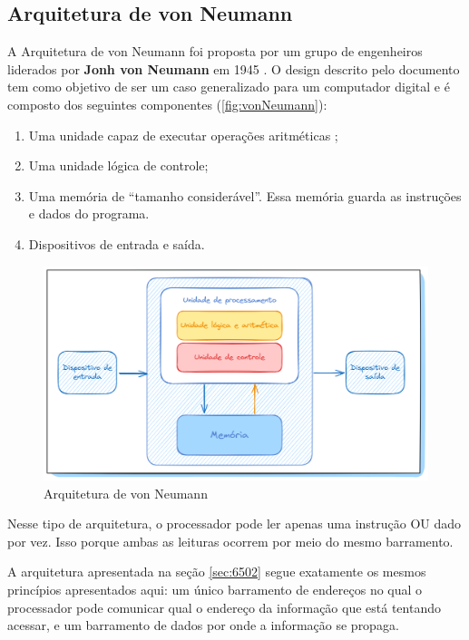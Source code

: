 \documentclass[
	12pt,				  %
	openright,		%
	a4paper,			%
	english,			%
	french,				%
	spanish,			%
	brazil,				%
]{abntex2}
\begin{document}
\subsection{Arquitetura de von Neumann}

A Arquitetura de von Neumann foi proposta por um grupo de engenheiros liderados
por \textbf{Jonh von Neumann} em 1945 \cite{vonNeumann}. O design descrito pelo
documento tem como objetivo de ser um caso generalizado para um computador
digital e é composto dos seguintes componentes (\autoref{fig:vonNeumann}):
\begin{enumerate}
	\item Uma unidade capaz de executar operações aritméticas ;
	\item Uma unidade lógica de controle;
	\item Uma memória de ``tamanho considerável''. Essa memória guarda as
	      instruções e dados do programa.
	\item Dispositivos de entrada e saída.
\end{enumerate}

\begin{figure}[h]
	\centering
	\caption{Arquitetura de von Neumann}
	\label{fig:vonNeumann}
	\includegraphics[scale=0.30]{../assets/img/von-neumann.png}
\end{figure}

Nesse tipo de arquitetura, o processador pode ler apenas uma instrução OU dado
por vez. Isso porque ambas as leituras ocorrem por meio do mesmo barramento.

A arquitetura apresentada na seção \ref{sec:6502} segue exatamente os mesmos
princípios apresentados aqui: um único barramento de endereços no qual o
processador pode comunicar qual o endereço da informação que está tentando
acessar, e um barramento de dados por onde a informação se propaga.
\end{document}
